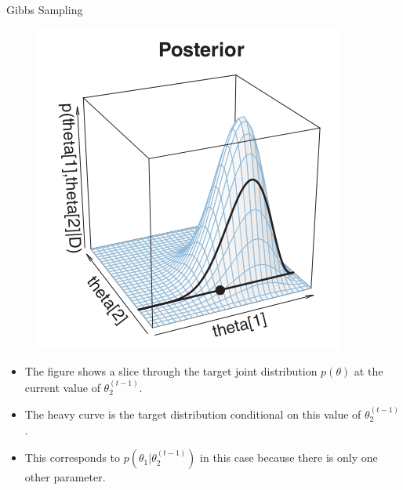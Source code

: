 \documentclass[handout]{beamer}
\begin{document}
\begin{frame}{Gibbs Sampling}
\scriptsize{


 \begin{figure}[h!]
	\centering
	\includegraphics[scale=0.38]{pics/gibbs1.png}
	\end{figure} 

\begin{itemize}

\item The figure shows a slice through the target joint distribution $p(\theta)$ at the current value of $\theta_2^{(t-1)}$.

\item The heavy curve is the target distribution conditional on this value of $\theta_2^{(t-1)}$.

\item This corresponds to $p(\theta_1|\theta_2^{(t-1)})$ in this case because there is only one other parameter.

\end{itemize}


} 
\end{frame}
\end{document}
